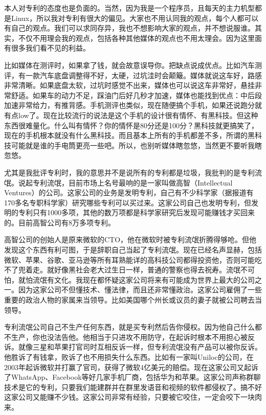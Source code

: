 \documentclass[
  letterpaper,
  DIV=11,
  numbers=noendperiod]{scrreprt}
\begin{document}
本人对专利的态度也是负面的。当然，因为我是一个程序员，且每天的主力机型都是Linux，所以我对专利有很大的偏见。大家也不用认同我的观点，每个人都可以有自己的观点。我们可以求同存异，我也不想影响大家的观点，并不想说服谁。其实，不仅不用理会我的观点，包括各种其他媒体的观点也不用太理会。因为这里面有很多我们看不见的利益。

比如媒体在测评时，如果拿了钱，就会故意误导你。把缺点说成优点。比如汽车测评，有一款汽车底盘调整得不好，太硬，过坑洼时会颠簸。媒体就说这车好，路感非常清晰。如果底盘太软，过坑时感觉不出来，媒体也可以说这车非常好，悬挂非常舒适。如果车的动力不足，踩油门后好几秒才加速，媒体也能找到优点：中后段加速非常给力，有推背感。手机测评也类似，现在随便搞个手机，如果还说跑分就有点low了。现在比较流行的说法是这个手机的设计很有情怀、有黑科技。但这种东西很难量化。什么叫有情怀？你的情怀是80分还是100分？黑科技就更搞笑了，现在的手机根本就没有什么黑科技。而且基本上所有的手机都差不多，所谓的黑科技可能就是谁的手电筒更亮一些吧。所以，也别听媒体瞎忽悠，当然更不要听我瞎忽悠。

尤其是我批评专利时，我的意思并不是说所有的专利都是垃圾，我批判的是专利流氓。说起专利流氓，目前市场上名号最响的是一家叫做高智（Intellectual
Ventures）的公司。这家公司的业务是发明专利，自己有不少科学家（据报道有170多名专职科学家）研究哪些专利可以买过来。这家公司自己也发明专利，但发明的专利只有1000多项，其他的数万项都是科学家研究后发现可能赚钱才买回来的。目前高智公司有8万多项专利。

高智公司的创始人是原来微软的CTO，他在微软时被专利流氓折腾得够呛。但他发现这个东西有利可图，于是辞职自己当起了专利流氓。现在已经名声显赫，包括微软、苹果、谷歌、亚马逊等所有耳熟能详的高科技公司都得投资他，否则可能吃不了兜着走。就好像黑社会老大过生日一样，普通的警察也得去祝寿。流氓不可怕，就怕流氓有文化。我现在都怀疑这家公司将来有可能成为世界上最大的公司之一。因为这家公司不但懂技术、懂法律，而且还非常懂政治。这家公司雇佣了一些重要的政治人物的家属来当领导。比如美国哪个州长或议员的妻子就被公司聘去当领导。

专利流氓公司自己不生产任何东西，就是买专利然后告你侵权。因为他自己什么都不生产，你也没法告他。他相当于只进攻不用防守，在起诉时根本不用担心被反诉。就像三星和苹果打官司时互相反诉一样，但专利流氓没有产品可以被你反诉。他胜诉了有钱拿，败诉了也不用损失什么东西。比如有一家叫Uniloc的公司，在2003年起诉微软并打赢了官司，获得了微软4亿美元的赔偿。现在这家公司又起诉了WhatsApp、Facebook等好几家手机厂商，包括华为和苹果。这家公司声称群聊技术是它的专利，只要我们能建群并在群里发语音和视频的软件都侵权了。搞不好这家公司又能赚不少钱。这家公司非常有经验，只要被它咬住，一定会咬下一块肉来。
\end{document}
